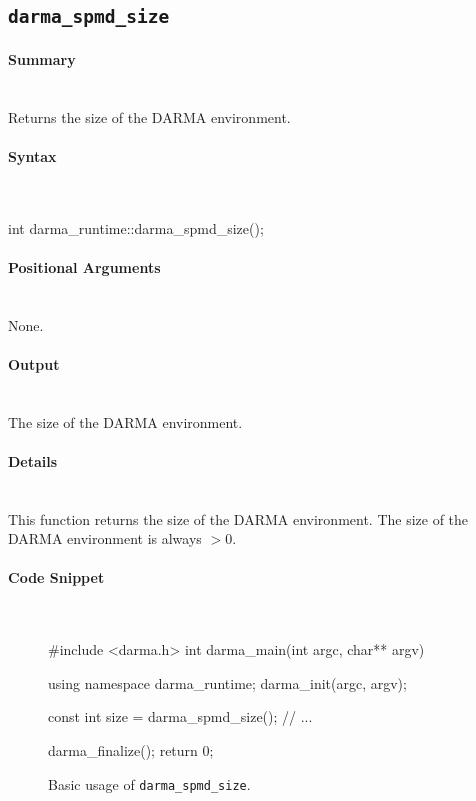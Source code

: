 \subsection{\texttt{darma\_spmd\_size}}


\paragraph{Summary}\mbox{}\\
Returns the size of the DARMA environment.

\paragraph{Syntax}\mbox{}\\
\begin{CppCode}
int darma_runtime::darma_spmd_size();
\end{CppCode}

\paragraph{Positional Arguments} \mbox{}\\
None. 

\paragraph{Output} \mbox{}\\
The size of the DARMA environment.

\paragraph{Details} \mbox{}\\
This function returns the size of the DARMA environment. 
The size of the DARMA environment is always $>0$.

\paragraph{Code Snippet} \mbox{}\\
\begin{figure}[!h]
\begin{CppCodeNumb}
#include <darma.h>
int darma_main(int argc, char** argv)
{
  using namespace darma_runtime;
  darma_init(argc, argv);

  const int size = darma_spmd_size();
  // ...

  darma_finalize();
  return 0;
}
\end{CppCodeNumb}
\label{fig:fe_api_ranksize}
\caption{Basic usage of \texttt{darma\_spmd\_size}.}
\end{figure}

